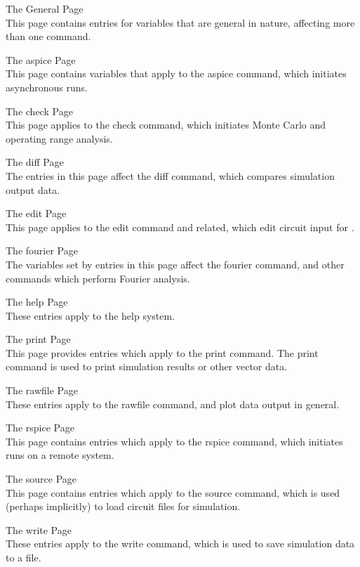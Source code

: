 \begin{description}
\item{The {\cb General} Page}\\
This page contains entries for variables that are general in nature,
affecting more than one command.

\item{The {\cb aspice} Page}\\
This page contains variables that apply to the {\cb aspice} command,
which initiates asynchronous {\WRspice} runs.

\item{The {\cb check} Page}\\
This page applies to the {\cb check} command, which initiates Monte
Carlo and operating range analysis.

\item{The {\cb diff} Page}\\
The entries in this page affect the {\cb diff} command, which compares
simulation output data.

\item{The {\cb edit} Page}\\
This page applies to the {\cb edit} command and related, which edit
circuit input for {\WRspice}.

\item{The {\cb fourier} Page}\\
The variables set by entries in this page affect the {\cb fourier}
command, and other commands which perform Fourier analysis.

\item{The {\cb help} Page}\\
These entries apply to the help system.

\item{The {\cb print} Page}\\
This page provides entries which apply to the {\cb print} command. 
The {\cb print} command is used to print simulation results or other
vector data.

\item{The {\cb rawfile} Page}\\
These entries apply to the {\cb rawfile} command, and plot data output
in general.

\item{The {\cb rspice} Page}\\
This page contains entries which apply to the {\cb rspice} command,
which initiates {\WRspice} runs on a remote system.

\item{The {\cb source} Page}\\
This page contains entries which apply to the {\cb source} command,
which is used (perhaps implicitly) to load circuit files for
simulation.

\item{The {\cb write} Page}\\
These entries apply to the {\cb write} command, which is used to save
simulation data to a file.
\end{description}

